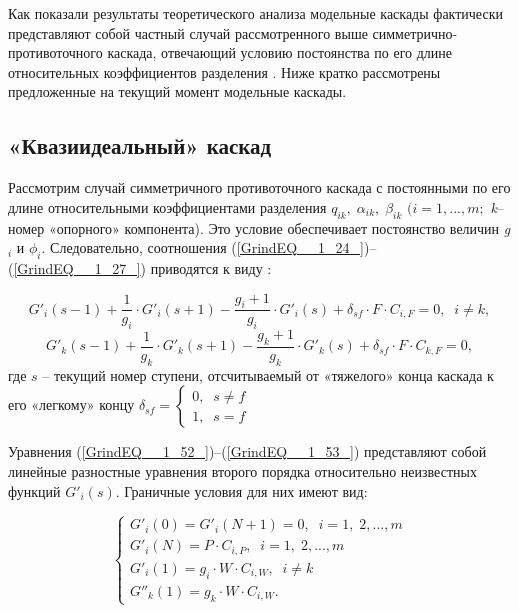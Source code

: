 Как показали результаты теоретического анализа модельные каскады фактически представляют собой частный случай рассмотренного выше симметрично-противоточного каскада, отвечающий условию постоянства по его длине относительных коэффициентов разделения \cite{sulaberidzeClassificationModelCascades2020}.  
Ниже кратко рассмотрены предложенные на текущий момент модельные каскады.

\subsection{«Квазиидеальный» каскад}

Рассмотрим случай симметричного противоточного каскада с постоянными по его длине относительными коэффициентами разделения $q_{ik} ,\; \alpha _{ik} ,\; \beta _{ik} $ $(i=1,...,m;$ \textit{k}--номер «опорного» компонента). Это условие обеспечивает постоянство величин \textit{g${}_{i}$} и $\phi _{i} $. Следовательно, соотношения (\ref{GrindEQ__1_24_})--(\ref{GrindEQ__1_27_}) приводятся к виду \cite{sulaberidzeTeoriyaKaskadovDlya2011}:

\begin{equation} \label{GrindEQ__1_52_} 
  G'_{i} (s-1)+\frac{1}{g_{i}} \cdot G'_{i} (s+1)-\frac{g_{i} +1}{g_{i} }\cdot G'_{i} (s)+\delta _{sf} \cdot F \cdot C_{i,F} =0,\; \; i\ne k, 
  \end{equation} 
  \begin{equation} \label{GrindEQ__1_53_} 
  G'_{k} (s-1)+\frac{1}{g_{k}} \cdot G'_{k} (s+1)-\frac{g_{k} +1}{g_{k} }\cdot G'_{k} (s)+\delta _{sf} \cdot F \cdot C_{k,F} =0, 
\end{equation}
где $s$ – текущий номер ступени, отсчитываемый от «тяжелого» конца каскада к его «легкому» концу $\delta _{sf} =\left\{\begin{array}{l} {0,\; \; s\ne f} \\ {1,\; \; s=f} \end{array}\right.$

Уравнения (\ref{GrindEQ__1_52_})--(\ref{GrindEQ__1_53_}) представляют собой линейные разностные уравнения второго порядка относительно неизвестных функций $G'_{i} (s)$. Граничные условия для них имеют вид:

\begin{equation} \label{GrindEQ__1_54_} 
  \left\{\begin{array}{l} {G'_{i} (0)=G'_{i} (N+1)=0,\; \; i=1,\; 2,...,m} \\
    {G'_{i} (N)=P \cdot C_{i,P} ,\; \; i=1,\; 2,...,m} \\
    {G'_{i} (1)=g_{i} \cdot W \cdot C_{i,W} ,\; \; i\ne k} \\
    {G''_{k} (1)=g_{k} \cdot W \cdot C_{i,W} .} \end{array}\right.  
\end{equation} 


